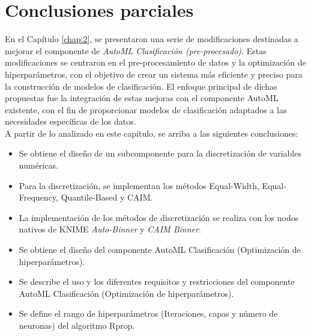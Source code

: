 \section{Conclusiones parciales}
En el Capítulo \ref{chap:2}, se presentaron una serie de modificaciones destinadas a mejorar el componente de \emph{AutoML Clasificación (pre-procesado)}. Estas modificaciones se centraron en el pre-procesamiento de datos y la optimización de hiperparámetros, con el objetivo de crear un sistema más eficiente y preciso para la construcción de modelos de clasificación. El enfoque principal de dichas propuestas fue la integración de estas mejoras con el componente AutoML existente, con el fin de proporcionar modelos de clasificación adaptados a las necesidades específicas de los datos.\\
A partir de lo analizado en este capítulo, se arriba a las siguientes conclusiones:
\begin{itemize}
	\item Se obtiene el diseño de un subcomponente para la discretización de variables numéricas.
	\item Para la discretización, se implementan los métodos Equal-Width, Equal-Frequency, Quantile-Based y CAIM.
	\item La implementación de los métodos de discretización se realiza con los nodos nativos de KNIME \textit{Auto-Binner} y \textit{CAIM Binner}.
	\item Se obtiene el diseño del componente AutoML Clasificación (Optimización de hiperparámetros).
	\item Se describe el uso y  los diferentes requisitos y restricciones del componente AutoML Clasificación (Optimización de hiperparámetros).
	\item Se define el rango de hiperparámetros (Iteraciones, capas y número de neuronas) del algoritmo Rprop.
\end{itemize}

\pagebreak

